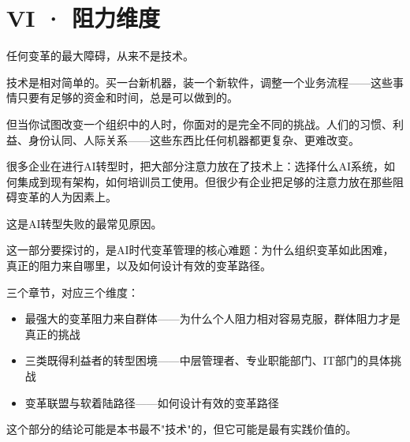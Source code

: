 \part{VI · 阻力维度}



任何变革的最大障碍，从来不是技术。

技术是相对简单的。买一台新机器，装一个新软件，调整一个业务流程——这些事情只要有足够的资金和时间，总是可以做到的。

但当你试图改变一个组织中的人时，你面对的是完全不同的挑战。人们的习惯、利益、身份认同、人际关系——这些东西比任何机器都更复杂、更难改变。

很多企业在进行AI转型时，把大部分注意力放在了技术上：选择什么AI系统，如何集成到现有架构，如何培训员工使用。但很少有企业把足够的注意力放在那些阻碍变革的人为因素上。

这是AI转型失败的最常见原因。

这一部分要探讨的，是AI时代变革管理的核心难题：为什么组织变革如此困难，真正的阻力来自哪里，以及如何设计有效的变革路径。

三个章节，对应三个维度：
\begin{itemize}
\item 最强大的变革阻力来自群体——为什么个人阻力相对容易克服，群体阻力才是真正的挑战
\item 三类既得利益者的转型困境——中层管理者、专业职能部门、IT部门的具体挑战
\item 变革联盟与软着陆路径——如何设计有效的变革路径

\end{itemize}
这个部分的结论可能是本书最不"技术"的，但它可能是最有实践价值的。
